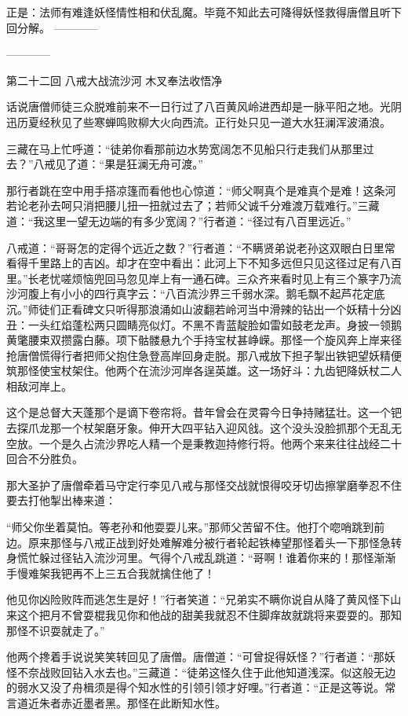 \documentclass[12pt,UTF8]{ctexbook}
\begin{document}
正是：法师有难逢妖怪情性相和伏乱魔。毕竟不知此去可降得妖怪救得唐僧且听下回分解。
------------


------------

第二十二回 八戒大战流沙河 木叉奉法收悟净

话说唐僧师徒三众脱难前来不一日行过了八百黄风岭进西却是一脉平阳之地。光阴迅历夏经秋见了些寒蝉鸣败柳大火向西流。正行处只见一道大水狂澜浑波涌浪。

三藏在马上忙呼道：“徒弟你看那前边水势宽阔怎不见船只行走我们从那里过去？”八戒见了道：“果是狂澜无舟可渡。”

那行者跳在空中用手搭凉篷而看他也心惊道：“师父啊真个是难真个是难！这条河若论老孙去呵只消把腰儿扭一扭就过去了；若师父诚千分难渡万载难行。”三藏道：“我这里一望无边端的有多少宽阔？”行者道：“径过有八百里远近。”

八戒道：“哥哥怎的定得个远近之数？”行者道：“不瞒贤弟说老孙这双眼白日里常看得千里路上的吉凶。却才在空中看出：此河上下不知多远但只见这径过足有八百里。”长老忧嗟烦恼兜回马忽见岸上有一通石碑。三众齐来看时见上有三个篆字乃流沙河腹上有小小的四行真字云：“八百流沙界三千弱水深。鹅毛飘不起芦花定底沉。”师徒们正看碑文只听得那浪涌如山波翻若岭河当中滑辣的钻出一个妖精十分凶丑：一头红焰蓬松两只圆睛亮似灯。不黑不青蓝靛脸如雷如鼓老龙声。身披一领鹅黄氅腰束双攒露白藤。项下骷髅悬九个手持宝杖甚峥嵘。那怪一个旋风奔上岸来径抢唐僧慌得行者把师父抱住急登高岸回身走脱。那八戒放下担子掣出铁钯望妖精便筑那怪使宝杖架住。他两个在流沙河岸各逞英雄。这一场好斗：九齿钯降妖杖二人相敌河岸上。

这个是总督大天蓬那个是谪下卷帘将。昔年曾会在灵霄今日争持赌猛壮。这一个钯去探爪龙那一个杖架磨牙象。伸开大四平钻入迎风戗。这个没头没脸抓那个无乱无空放。一个是久占流沙界吃人精一个是秉教迦持修行将。他两个来来往往战经二十回合不分胜负。

那大圣护了唐僧牵着马守定行李见八戒与那怪交战就恨得咬牙切齿擦掌磨拳忍不住要去打他掣出棒来道：

“师父你坐着莫怕。等老孙和他耍耍儿来。”那师父苦留不住。他打个唿哨跳到前边。原来那怪与八戒正战到好处难解难分被行者轮起铁棒望那怪着头一下那怪急转身慌忙躲过径钻入流沙河里。气得个八戒乱跳道：“哥啊！谁着你来的！那怪渐渐手慢难架我钯再不上三五合我就擒住他了！

他见你凶险败阵而逃怎生是好！”行者笑道：“兄弟实不瞒你说自从降了黄风怪下山来这个把月不曾耍棍我见你和他战的甜美我就忍不住脚痒故就跳将来耍耍的。那知那怪不识耍就走了。”

他两个搀着手说说笑笑转回见了唐僧。唐僧道：“可曾捉得妖怪？”行者道：“那妖怪不奈战败回钻入水去也。”三藏道：“徒弟这怪久住于此他知道浅深。似这般无边的弱水又没了舟楫须是得个知水性的引领引领才好哩。”行者道：“正是这等说。常言道近朱者赤近墨者黑。那怪在此断知水性。
\end{document}
